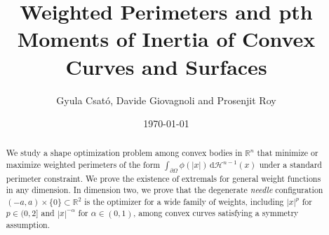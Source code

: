 \documentclass[10pt,leqno]{amsart}
\newcommand{\R}[0]{\mathbb{R}}
\newcommand{\dd}{\, \mathrm{d}}
\numberwithin{Theorem}{section}
\theoremstyle{definition}
\theoremstyle{remark}
\numberwithin{equation}{section}
\numberwithin{equation}{section}
\begin{document}
\title[Weighted perimeter of convex sets]{Weighted Perimeters and  pth Moments of Inertia of Convex Curves and Surfaces} %
\author[]{Gyula Csató, Davide Giovagnoli and Prosenjit Roy}
\date{\today}
\address{Gyula Csató: Facultat de Matemàtiques i Informàtica, Universitat de Barcelona\\ 
Gran Via de les Corts Catalanes, 585, 08007, Barcelona, Spain
}
\address{Centre de Recerca Matemàtica, Edifici C, Campus Bellaterra, 08193 Bellaterrra, Spain}
\address{Davide Giovagnoli: Dipartimento di Matematica, Università di Bologna, Piazza di Porta \\ S.Donato 5, 40126, Bologna-Italy}
\address{Prosenjit Roy: Department of Mathematics and Statistics, IIT-Kanpur, India}
\maketitle





\begingroup
\let\thefootnote\relax
{} %

\endgroup







\tableofcontents 
\begin{abstract}

We study a shape optimization problem among convex bodies in $\mathbb{R}^n$ that minimize or maximize weighted perimeters of the form $\int_{\partial\Omega} \phi(|x|) \dd \mathcal{H}^{n-1}(x)$ under a standard perimeter constraint. We prove the existence of extremals for general weight functions in any dimension. In dimension two, we prove that the degenerate \textit{needle} configuration $(-a,a)\times \{0\} \subset \R^2$ is the optimizer for a wide family of weights, including $|x|^p$ for $p \in (0,2]$ and $|x|^{-\alpha}$ for $\alpha \in (0,1)$, among convex curves satisfying a symmetry assumption. 



\end{abstract} %
\end{document}
